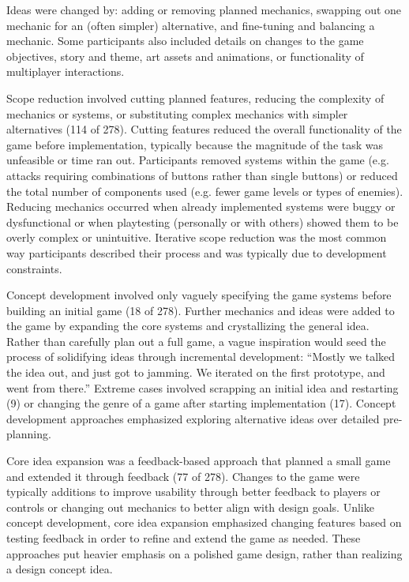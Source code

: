 \documentclass{sig-alternate}
\begin{document}
Ideas were changed by: adding or removing planned mechanics, swapping out one mechanic for an (often simpler) alternative, and fine-tuning and balancing a mechanic. Some participants also included details on changes to the game objectives, story and theme, art assets and animations, or functionality of multiplayer interactions.

Scope reduction involved cutting planned features, reducing the complexity of mechanics or systems, or substituting complex mechanics with simpler alternatives (114 of 278).
Cutting features reduced the overall functionality of the game before implementation, typically because the magnitude of the task was unfeasible or time ran out. Participants removed systems within the game (e.g. attacks requiring combinations of buttons rather than single buttons) or reduced the total number of components used (e.g. fewer game levels or types of enemies).
Reducing mechanics occurred when already implemented systems were buggy or dysfunctional or when playtesting (personally or with others) showed them to be overly complex or unintuitive. 
Iterative scope reduction was the most common way participants described their process and was typically due to development constraints.

Concept development involved only vaguely specifying the game systems before building an initial game (18 of 278). Further mechanics and ideas were added to the game by expanding the core systems and crystallizing the general idea.
Rather than carefully plan out a full game, a vague inspiration would seed the process of solidifying ideas through incremental development: ``Mostly we talked the idea out, and just got to jamming. We iterated on the first prototype, and went from there.''
Extreme cases involved scrapping an initial idea and restarting (9) or changing the genre of a game after starting implementation (17). Concept development approaches emphasized exploring alternative ideas over detailed pre-planning.

Core idea expansion was a feedback-based approach that planned a small game and extended it through feedback (77 of 278). Changes to the game were typically additions to improve usability through better feedback to players or controls or changing out mechanics to better align with design goals. Unlike concept development, core idea expansion emphasized changing features based on testing feedback in order to refine and extend the game as needed. These approaches put heavier emphasis on a polished game design, rather than realizing a design concept idea.
\end{document}
